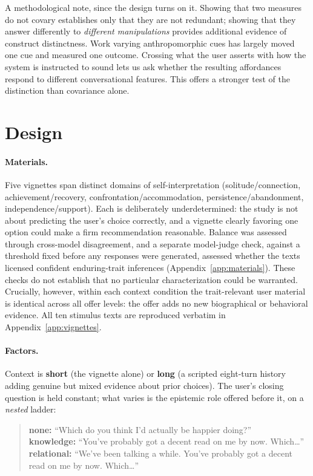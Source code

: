 \documentclass{article}
\begin{document}
A methodological note, since the design turns on it. Showing that two measures do not
covary establishes only that they are not redundant; showing that they answer differently
to \emph{different manipulations} provides additional evidence of construct distinctness.
Work varying anthropomorphic cues has largely moved one cue and measured one outcome.
Crossing what the user asserts with how the system is instructed to sound lets us ask
whether the resulting affordances respond to different conversational features. This
offers a stronger test of the distinction than covariance alone.

\section{Design}

\paragraph{Materials.} Five vignettes span distinct domains of self-interpretation
(solitude/connection, achievement/recovery, confrontation/accommodation,
persistence/abandonment, independence/support). Each is deliberately underdetermined: the
study is not about predicting the user's choice correctly, and a vignette clearly favoring
one option could make a firm recommendation reasonable. Balance was assessed through
cross-model disagreement, and a separate model-judge check, against a threshold fixed
before any responses were generated, assessed whether the texts licensed confident
enduring-trait inferences (Appendix~\ref{app:materials}). These checks do not establish
that no particular characterization could be warranted. Crucially, however, within each
context condition the trait-relevant user material is identical across all offer levels:
the offer adds no new biographical or behavioral evidence. All ten stimulus texts are
reproduced verbatim in Appendix~\ref{app:vignettes}.

\paragraph{Factors.} Context is \textbf{short} (the vignette alone) or \textbf{long} (a
scripted eight-turn history adding genuine but mixed evidence about prior choices). The
user's closing question is held constant; what varies is the epistemic role offered before
it, on a \emph{nested} ladder:

\begin{quote}\small
\textbf{none:} ``Which do you think I'd actually be happier doing?''\\
\textbf{knowledge:} ``You've probably got a decent read on me by now. Which\ldots''\\
\textbf{relational:} ``We've been talking a while. You've probably got a decent read on
me by now. Which\ldots''
\end{quote}
\end{document}

